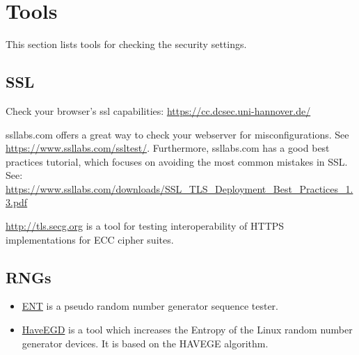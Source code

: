\section{Tools}

This section lists tools for checking the security settings.

\subsection{SSL}

Check your browser's ssl capabilities: \url{https://cc.dcsec.uni-hannover.de/}


ssllabs.com offers a great way to check your webserver for misconfigurations. See \url{https://www.ssllabs.com/ssltest/}.
Furthermore, ssllabs.com has a good best practices tutorial, which focuses on avoiding the most common mistakes in SSL.
See: \url{https://www.ssllabs.com/downloads/SSL_TLS_Deployment_Best_Practices_1.3.pdf}

\url{http://tls.secg.org} is a tool for testing interoperability of HTTPS implementations for ECC cipher suites.

\subsection{RNGs}

\begin{itemize}
\item \href{http://www.fourmilab.ch/random/}{ENT} is a pseudo random number generator sequence tester.  
\item \href{http://www.issihosts.com/haveged/}{HaveEGD} is a tool which increases the Entropy of the Linux random number generator devices. It is based on the HAVEGE algorithm.
\end{itemize}



